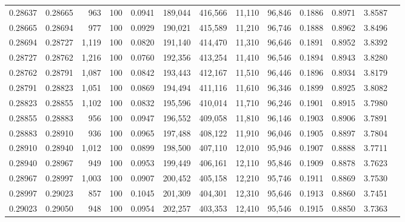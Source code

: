 \begin{tabular}{rrrrrrrrrrrrr}
0.28637 & 0.28665 &   963 & 100 &                                     0.0941 & 189,044 & 416,566 &  11,110 &  96,846 & 0.1886 & 0.8971 & 3.8587 \\
0.28665 & 0.28694 &   977 & 100 &                                     0.0929 & 190,021 & 415,589 &  11,210 &  96,746 & 0.1888 & 0.8962 & 3.8496 \\
0.28694 & 0.28727 & 1,119 & 100 &                                     0.0820 & 191,140 & 414,470 &  11,310 &  96,646 & 0.1891 & 0.8952 & 3.8392 \\
0.28727 & 0.28762 & 1,216 & 100 &                                     0.0760 & 192,356 & 413,254 &  11,410 &  96,546 & 0.1894 & 0.8943 & 3.8280 \\
0.28762 & 0.28791 & 1,087 & 100 &                                     0.0842 & 193,443 & 412,167 &  11,510 &  96,446 & 0.1896 & 0.8934 & 3.8179 \\
0.28791 & 0.28823 & 1,051 & 100 &                                     0.0869 & 194,494 & 411,116 &  11,610 &  96,346 & 0.1899 & 0.8925 & 3.8082 \\
0.28823 & 0.28855 & 1,102 & 100 &                                     0.0832 & 195,596 & 410,014 &  11,710 &  96,246 & 0.1901 & 0.8915 & 3.7980 \\
0.28855 & 0.28883 &   956 & 100 &                                     0.0947 & 196,552 & 409,058 &  11,810 &  96,146 & 0.1903 & 0.8906 & 3.7891 \\
0.28883 & 0.28910 &   936 & 100 &                                     0.0965 & 197,488 & 408,122 &  11,910 &  96,046 & 0.1905 & 0.8897 & 3.7804 \\
0.28910 & 0.28940 & 1,012 & 100 &                                     0.0899 & 198,500 & 407,110 &  12,010 &  95,946 & 0.1907 & 0.8888 & 3.7711 \\
0.28940 & 0.28967 &   949 & 100 &                                     0.0953 & 199,449 & 406,161 &  12,110 &  95,846 & 0.1909 & 0.8878 & 3.7623 \\
0.28967 & 0.28997 & 1,003 & 100 &                                     0.0907 & 200,452 & 405,158 &  12,210 &  95,746 & 0.1911 & 0.8869 & 3.7530 \\
0.28997 & 0.29023 &   857 & 100 &                                     0.1045 & 201,309 & 404,301 &  12,310 &  95,646 & 0.1913 & 0.8860 & 3.7451 \\
0.29023 & 0.29050 &   948 & 100 &                                     0.0954 & 202,257 & 403,353 &  12,410 &  95,546 & 0.1915 & 0.8850 & 3.7363 \\

\end{tabular}
